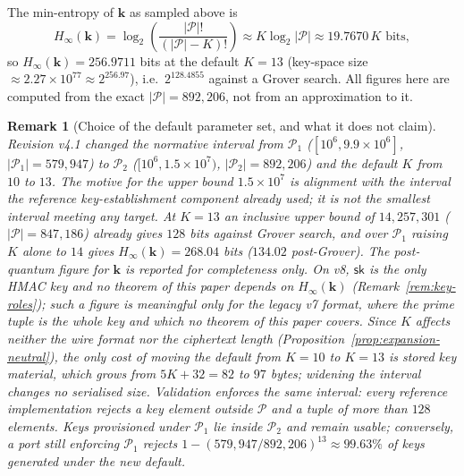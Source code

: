 \documentclass[11pt,a4paper]{article}
\newtheorem{remark}[theorem]{Remark}
\begin{document}
The min-entropy of $\mathbf{k}$ as sampled above is
\[
  H_\infty(\mathbf{k}) = \log_2\!\left(\frac{|\mathcal{P}|!}{(|\mathcal{P}|-K)!}\right) \approx K\log_2|\mathcal{P}| \approx 19.7670\,K \text{ bits},
\]
so $H_\infty(\mathbf{k}) = 256.9711$ bits at the default $K=13$
(key-space size $\approx 2.27\times10^{77}\approx 2^{256.97}$), i.e.\
$2^{128.4855}$ against a Grover search. All figures
here are computed from the exact $|\mathcal{P}|=892{,}206$, not from an
approximation to it.

\begin{remark}[Choice of the default parameter set, and what it does not claim]\label{rem:pq128}
Revision v4.1 changed the normative interval from $\mathcal{P}_1$
($[10^6,9.9\times10^6]$, $|\mathcal{P}_1|=579{,}947$) to $\mathcal{P}_2$
($[10^6,1.5\times10^7)$, $|\mathcal{P}_2|=892{,}206$) and the default $K$
from $10$ to $13$. The motive for the upper bound $1.5\times10^7$ is
alignment with the interval the reference key-establishment component
already used; it is \emph{not} the smallest interval meeting any target.
At $K=13$ an inclusive upper bound of $14{,}257{,}301$
($|\mathcal{P}|=847{,}186$) already gives $128$ bits against Grover
search, and over $\mathcal{P}_1$ raising $K$ alone to $14$ gives
$H_\infty(\mathbf{k})=268.04$ bits ($134.02$ post-Grover).
The post-quantum figure for $\mathbf{k}$ is reported for completeness
only. On v8, $\mathsf{sk}$ is the only HMAC key and no theorem of this
paper depends on $H_\infty(\mathbf{k})$ (Remark~\ref{rem:key-roles}); such
a figure is meaningful only for the legacy v7 format, where the prime tuple
is the whole key and which no theorem of this paper covers. Since $K$
affects neither the wire format nor the ciphertext length
(Proposition~\ref{prop:expansion-neutral}), the only cost of moving the
default from $K=10$ to $K=13$ is stored key material, which grows from
$5K+32=82$ to $97$ bytes; widening the interval changes no serialised size.
Validation enforces the same interval: every reference implementation
rejects a key element outside $\mathcal{P}$ and a tuple of more than $128$
elements. Keys provisioned under $\mathcal{P}_1$ lie inside $\mathcal{P}_2$
and remain usable; conversely, a port still enforcing $\mathcal{P}_1$
rejects $1-(579{,}947/892{,}206)^{13}\approx99.63\%$ of keys generated
under the new default.
\end{remark}
\end{document}
